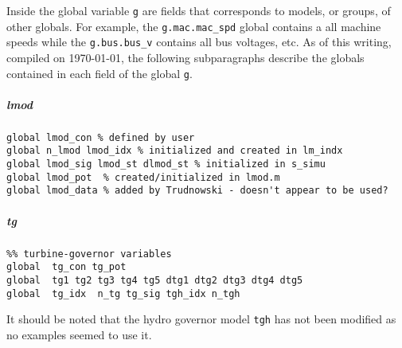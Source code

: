 \documentclass[12pt]{article}
\begin{document}
Inside the global variable \verb|g| are fields that corresponds to models, or groups, of other globals.
For example, the \verb|g.mac.mac_spd| global contains a all machine speeds while the \verb|g.bus.bus_v| contains all bus voltages, etc.
As of this writing, compiled on \today, the following subparagraphs describe the globals contained in each field of the global \verb|g|. 

\subparagraph{lmod}
\begin{verbatim}
global lmod_con % defined by user
global n_lmod lmod_idx % initialized and created in lm_indx
global lmod_sig lmod_st dlmod_st % initialized in s_simu
global lmod_pot  % created/initialized in lmod.m 
global lmod_data % added by Trudnowski - doesn't appear to be used?
\end{verbatim}

\subparagraph{tg}
\begin{verbatim}
%% turbine-governor variables
global  tg_con tg_pot
global  tg1 tg2 tg3 tg4 tg5 dtg1 dtg2 dtg3 dtg4 dtg5
global  tg_idx  n_tg tg_sig tgh_idx n_tgh
\end{verbatim}
It should be noted that the hydro governor model \verb|tgh| has not been modified as no examples seemed to use it.
\end{document}
